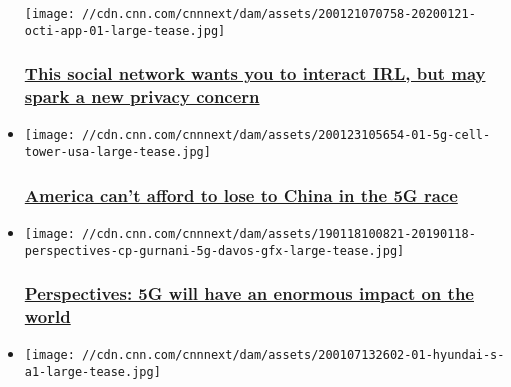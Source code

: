 \begin{itemize}
  \texttt{[image: //cdn.cnn.com/cnnnext/dam/assets/200121070758-20200121-octi-app-01-large-tease.jpg]}

  \hypertarget{this-social-network-wants-you-to-interact-irl-but-may-spark-a-new-privacy-concern}{%
  \subsubsection{\texorpdfstring{\href{/2020/01/22/tech/octi-social-platform-launch/index.html}{This
  social network wants you to interact IRL, but may spark a new privacy
  concern}}{This social network wants you to interact IRL, but may spark a new privacy concern}}\label{this-social-network-wants-you-to-interact-irl-but-may-spark-a-new-privacy-concern}}
\item
  \href{/2020/01/24/perspectives/america-china-5g-race/index.html}{}

  \texttt{[image: //cdn.cnn.com/cnnnext/dam/assets/200123105654-01-5g-cell-tower-usa-large-tease.jpg]}

  \hypertarget{america-cant-afford-to-lose-to-china-in-the-5g-race}{%
  \subsubsection{\texorpdfstring{\href{/2020/01/24/perspectives/america-china-5g-race/index.html}{America
  can't afford to lose to China in the 5G
  race}}{America can't afford to lose to China in the 5G race}}\label{america-cant-afford-to-lose-to-china-in-the-5g-race}}
\item
  \href{/2019/01/18/perspectives/davos-5g-tech-mahindra/index.html}{}

  \texttt{[image: //cdn.cnn.com/cnnnext/dam/assets/190118100821-20190118-perspectives-cp-gurnani-5g-davos-gfx-large-tease.jpg]}

  \hypertarget{perspectives-5g-will-have-an-enormous-impact-on-the-world}{%
  \subsubsection{\texorpdfstring{\href{/2019/01/18/perspectives/davos-5g-tech-mahindra/index.html}{Perspectives:
  5G will have an enormous impact on the
  world}}{Perspectives: 5G will have an enormous impact on the world}}\label{perspectives-5g-will-have-an-enormous-impact-on-the-world}}
\item
  \href{/videos/business/2020/01/09/uber-hyundai-flying-taxi-orig.cnn-business}{}

  \texttt{[image: //cdn.cnn.com/cnnnext/dam/assets/200107132602-01-hyundai-s-a1-large-tease.jpg]}


\end{itemize}

